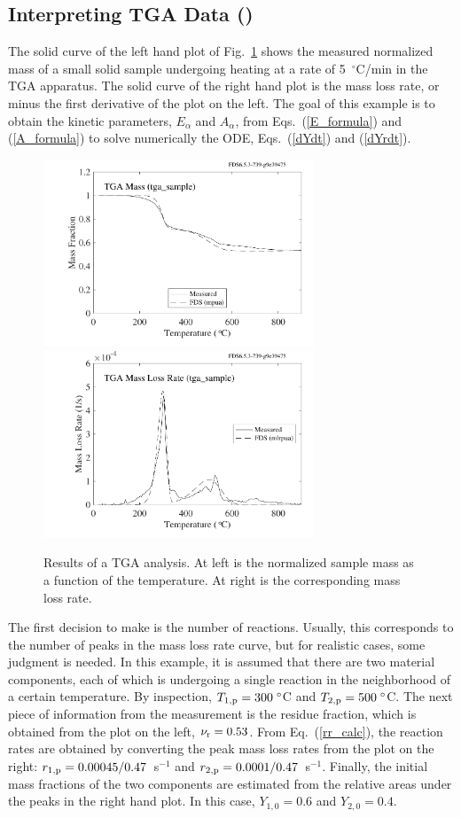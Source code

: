 \documentclass[11pt]{book}
\begin{document}
\subsection{Interpreting TGA Data (\texorpdfstring{}{tga\_sample})}
\label{tga_sample}

The solid curve of the left hand plot of Fig.~\ref{tga_sample_plot} shows the measured normalized mass of a small solid sample undergoing heating at a rate of 5~$^\circ$C/min in the TGA apparatus. The solid curve of the right hand plot is the mass loss rate, or minus the first derivative of the plot on the left. The goal of this example is to obtain the kinetic parameters, $E_\alpha$ and $A_\alpha$, from Eqs.~(\ref{E_formula}) and (\ref{A_formula}) to solve numerically the ODE, Eqs.~(\ref{dYdt}) and (\ref{dYrdt}).
\begin{figure}[!htb]
\includegraphics[height=2.2in]{SCRIPT_FIGURES/tga_sample_mass}
\includegraphics[height=2.2in]{SCRIPT_FIGURES/tga_sample_mlr}
\caption[Results of a TGA analysis]{Results of a TGA analysis. At left is the normalized sample mass as a function of the temperature. At right is the corresponding mass loss rate.}
\label{tga_sample_plot}
\end{figure}
The first decision to make is the number of reactions. Usually, this corresponds to the number of peaks in the mass loss rate curve, but for realistic cases, some judgment is needed. In this example, it is assumed that there are two material components, each of which is undergoing a single reaction in the neighborhood of a certain temperature. By inspection, $T_{1,{\rm p}}=300 \; ^\circ$C and $T_{2,{\rm p}}=500 \; ^\circ$C. The next piece of information from the measurement is the residue fraction, which is obtained from the plot on the left, $\nu_{\rm r}=0.53$. From Eq.~(\ref{rr_calc}), the reaction rates are obtained by converting the peak mass loss rates from the plot on the right: $r_{1,{\rm p}}=0.00045/0.47$~s$^{-1}$ and $r_{2,{\rm p}}=0.0001/0.47$~s$^{-1}$.  Finally, the initial mass fractions of the two components are estimated from the relative areas under the peaks in the right hand plot. In this case, $Y_{1,0}=0.6$ and $Y_{2,0}=0.4$.
\end{document}
